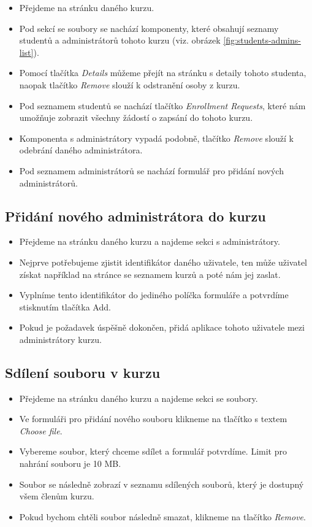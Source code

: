  \begin{itemize}
	\item Přejdeme na stránku daného kurzu.
	\item Pod sekcí se soubory se nachází komponenty, které obsahují seznamy studentů a administrátorů tohoto kurzu (viz. obrázek \ref{fig:students-admins-list}). 
	\item Pomocí tlačítka \textit{Details} můžeme přejít na stránku s detaily tohoto studenta, naopak tlačítko \textit{Remove} slouží k odstranění osoby z kurzu.
	\item Pod seznamem studentů se nachází tlačítko \textit{Enrollment Requests}, které nám umožňuje zobrazit všechny žádostí o zapsání do tohoto kurzu.
	\item Komponenta s administrátory vypadá podobně, tlačítko \textit{Remove} slouží k odebrání daného administrátora.
	\item Pod seznamem administrátorů se nachází formulář pro přidání nových administrátorů.
\end{itemize}

\subsection{Přidání nového administrátora do kurzu}

\begin{itemize}
	\item Přejdeme na stránku daného kurzu a najdeme sekci s administrátory.
	\item Nejprve potřebujeme zjistit identifikátor daného uživatele, ten může uživatel získat například na stránce se seznamem kurzů a poté nám jej zaslat.
	\item Vyplníme tento identifikátor do jediného políčka formuláře a potvrdíme stisknutím tlačítka Add.
	\item Pokud je požadavek úspěšně dokončen, přidá aplikace tohoto uživatele mezi administrátory kurzu.
\end{itemize}

\subsection{Sdílení souboru v kurzu}
\begin{itemize}
	\item Přejdeme na stránku daného kurzu a najdeme sekci se soubory.
	\item Ve formuláři pro přidání nového souboru klikneme na tlačítko s textem \textit{Choose file}.
	\item Vybereme soubor, který chceme sdílet a formulář potvrdíme. Limit pro nahrání souboru je 10 MB.
	\item Soubor se následně zobrazí v seznamu sdílených souborů, který je dostupný všem členům kurzu.
	\item Pokud bychom chtěli soubor následně smazat, klikneme na tlačítko \textit{Remove}.
\end{itemize}

